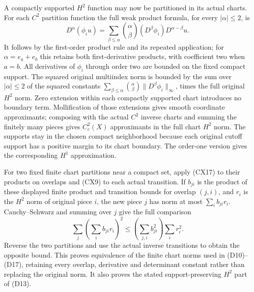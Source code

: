 \documentclass[
  11pt,
]{article}
\begin{document}
A compactly supported \(H^2\) function may now be partitioned in its
actual charts. For each \(C^2\) partition function the full weak product
formula, for every \(|\alpha|\leq2\), is \[
 D^\alpha(\phi_i u)=
   \sum_{\beta\leq\alpha}\binom{\alpha}{\beta}
                   (D^\beta\phi_i)D^{\alpha-\beta}u.             \tag{CX17}
\] It follows by the first-order product rule and its repeated
application; for \(\alpha=e_a+e_b\) this retains both first-derivative
products, with coefficient two when \(a=b\). All derivatives of
\(\phi_i\) through order two are bounded on the fixed compact support.
The squared original multiindex norm is bounded by the sum over
\(|\alpha|\leq2\) of the squared constants
\(\sum_{\beta\leq\alpha}\binom{\alpha}{\beta}\|D^\beta\phi_i\|_\infty\),
times the full original \(H^2\) norm. Zero extension within each
compactly supported chart introduces no boundary term. Mollification of
those extensions gives smooth coordinate approximants; composing with
the actual \(C^2\) inverse charts and summing the finitely many pieces
gives \(C_c^2(X)\) approximants in the full chart \(H^2\) norm. The
supports stay in the chosen compact neighborhood because each original
cutoff support has a positive margin to its chart boundary. The
order-one version gives the corresponding \(H^1\) approximation.

For two fixed finite chart partitions near a compact set, apply (CX17)
to their products on overlaps and (CX9) to each actual transition. If
\(b_{ji}\) is the product of these displayed finite product and
transition bounds for overlap \((j,i)\), and \(r_i\) is the \(H^2\) norm
of original piece \(i\), the new piece \(j\) has norm at most
\(\sum_i b_{ji}r_i\). Cauchy--Schwarz and summing over \(j\) give the
full comparison \[
       \sum_j\left(\sum_i b_{ji}r_i\right)^2
          \leq\left(\sum_{j,i}b_{ji}^2\right)\sum_i r_i^2.        \tag{CX18}
\] Reverse the two partitions and use the actual inverse transitions to
obtain the opposite bound. This proves equivalence of the finite chart
norms used in (D10)--(D17), retaining every overlap, derivative and
determinant constant rather than replacing the original norm. It also
proves the stated support-preserving \(H^2\) part of (D13).
\end{document}
